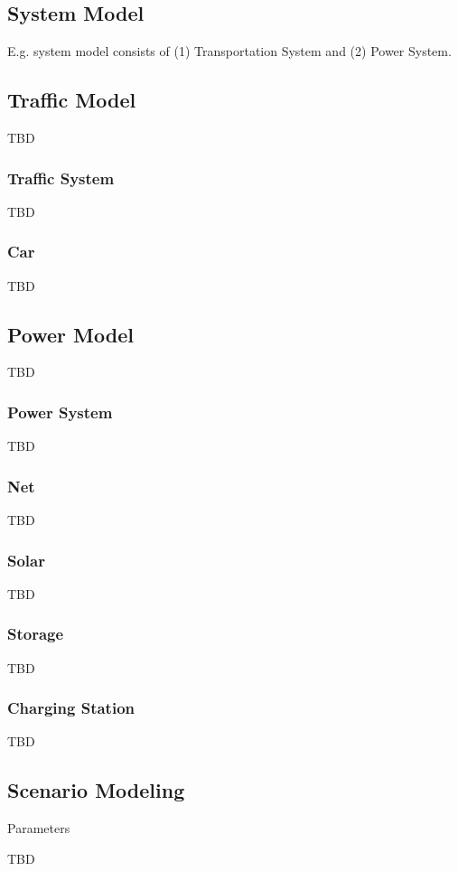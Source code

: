 \subsection{System Model}

E.g. system model consists of (1) Transportation System and (2) Power System.


\subsection{Traffic Model}

TBD

\subsubsection{Traffic System}

TBD

\subsubsection{Car}

TBD

\subsection{Power Model}

TBD

\subsubsection{Power System}

TBD

\subsubsection{Net}

TBD

\subsubsection{Solar}

TBD

\subsubsection{Storage}

TBD

\subsubsection{Charging Station}

TBD

\subsection{Scenario Modeling}

Parameters

TBD